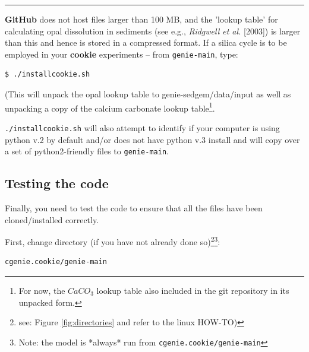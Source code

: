 \vspace{1mm}\noindent\rule{4cm}{0.5pt}\vspace{2mm}

\noindent \textbf{GitHub} does not host files larger than 100 MB, and the 'lookup table' for calculating opal dissolution in sediments (see e.g., \textit{Ridgwell et al.} [2003]) is larger than this and hence is stored in a compressed format. If a silica cycle is to be employed in your \textbf{cookie} experiments -- from \texttt{\small genie-main}, type:

\vspace{-2mm}\small\begin{verbatim}
$ ./installcookie.sh
\end{verbatim}\normalsize\vspace{-2mm}

\noindent (This will unpack the opal lookup table to \textsf{\footnotesize genie-sedgem/data/input} as well as unpacking a copy of the calcium carbonate lookup table\footnote{For now, the \(CaCO_{3}\) lookup table also included in the git repository in its unpacked form.}.

\texttt{./installcookie.sh} will also attempt to identify if your computer is using python v.2 by default and/or does not have python v.3 install and will copy over a set of python2-friendly files to \texttt{\small genie-main}.

\newpage

\subsection{Testing the code}

\noindent Finally, you need to test the code to ensure that all the files have been cloned/installed correctly.

\vspace{1mm} 
\noindent First, change directory (if you have not already done so)\footnote{see: Figure \ref{fig:directories} and refer to the linux HOW-TO)}\footnote{Note: the model is *always* run from \texttt{cgenie.cookie/genie-main}}:
\vspace{-2mm}\begin{verbatim}
cgenie.cookie/genie-main
\end{verbatim}\vspace{-2mm}

